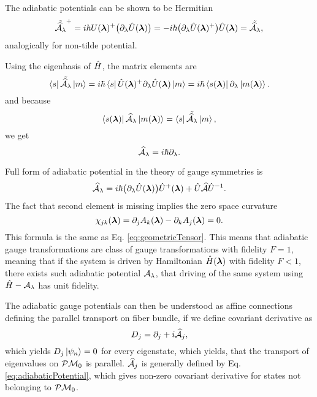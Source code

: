 The adiabatic potentials can be shown to be Hermitian
\begin{equation}
     \tilde{\AA_\lambda}^+=i\hbar U(\llambda)^+\big(\partial_\lambda\U(\llambda)\big)=-i\hbar\big(\partial_\lambda\U(\llambda)^+\big)\U(\llambda) = \tilde{\AA_\lambda},
     \label{eq:counterdiabaticPotentialTwoSystems}
\end{equation}
analogically for non-tilde potential.

Using the eigenbasis of $\HH$, the matrix elements are
\begin{equation}
    \bra{s}\tilde{\AA_\lambda}\ket{m}=i\hbar\bra{s}\U(\llambda)^+\partial_\lambda\U(\llambda)\ket{m} = i\hbar\bra{s(\llambda)}\partial_\lambda\ket{m(\llambda)}.
\end{equation}
and because
\begin{equation}
    \bra{s(\llambda)}\AA_\lambda\ket{ m(\llambda)}= \bra{s}\tilde{\AA_\lambda}\ket{m},
\end{equation}
we get
\begin{equation}
    \AA_\lambda = i\hbar\partial_\lambda.
    \label{eq:adiabaticPotentialDefinition}
\end{equation}



Full form of adiabatic potential in the theory of gauge symmetries is
\begin{equation}
    \AA_\lambda=i\hbar \big(\partial_\lambda \U(\llambda)\big)\U^+(\llambda) + \U \AA \U^{-1}.
\end{equation}
The fact that second element is missing implies the zero space curvature
\begin{equation}
    \chi_{jk}(\llambda) = \partial_j A_k(\llambda)-\partial_k A_j(\llambda) = 0.
\end{equation}
This formula is the same as Eq. \ref{eq:geometricTensor}. This means that adiabatic gauge transformations are class of gauge transformations with fidelity $F=1$, meaning that if the system is driven by Hamiltonian $\HH(\llambda)$ with fidelity $F<1$, there exists such adiabatic potential $\A_\lambda$, that driving of the same system using $\HH-\A_\lambda$ has unit fidelity.

The adiabatic gauge potentials can then be understood as affine connections defining the parallel transport on fiber bundle, if we define covariant derivative as
\begin{equation}
    D_j=\partial_j+i\AA_j,
\end{equation}
which yields $D_j\ket{\psi_n}=0$ for every eigenstate, which yields, that the transport of eigenvalues on $\P\M_0$ is parallel. $\AA_j$ is generally defined by Eq. \ref{eq:adiabaticPotential}, which gives non-zero covariant derivative for states not belonging to $\P\M_0$. 


